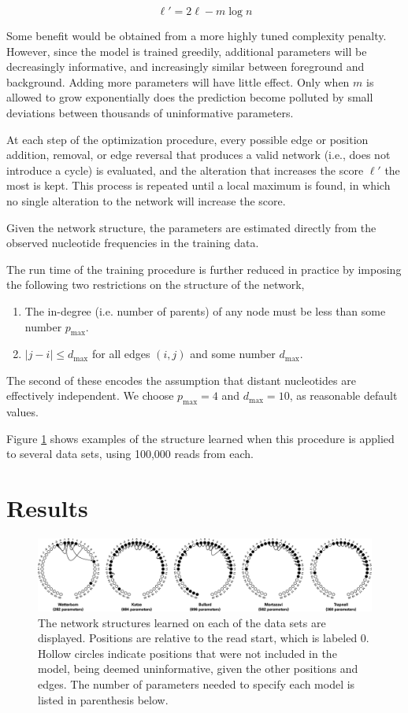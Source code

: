 \documentclass{bioinfo}
\begin{document}
$$ \ell' = 2 \ell - m \log n $$

Some benefit would be obtained from a more highly tuned complexity penalty.
However, since the model is trained greedily, additional parameters will be
decreasingly informative, and increasingly similar between foreground and
background. Adding more parameters will have little effect.  Only when $m$ is
allowed to grow exponentially does the prediction become polluted by small
deviations between thousands of uninformative parameters.

At each step of the optimization procedure, every possible edge or position
addition, removal, or edge reversal that produces a valid network (i.e., does not
introduce a cycle) is evaluated, and the alteration that increases the score
$\ell'$ the most is kept.  This process is repeated until a local maximum is
found, in which no single alteration to the network will increase the score.

Given the network structure, the parameters are estimated directly from the
observed nucleotide frequencies in the training data.

The run time of the training procedure is further reduced in practice by imposing the
following two restrictions on the structure of the network,
\begin{enumerate}
\item The in-degree (i.e. number of parents) of any node must be less than some
number $p_{\text{max}}$.
\item $|j - i| \le d_{\text{max}}$ for all edges $(i,j)$ and some number $d_{\text{max}}$.
\end{enumerate}
The second of these encodes the assumption that distant nucleotides are
effectively independent. We choose $p_{\text{max}} = 4$ and $d_{\text{max}} =
10$, as reasonable default values.

Figure \ref{fig:models} shows examples of the structure learned when this
procedure is applied to several data sets, using 100,000 reads from each.


\section{Results}

\begin{figure}
\centerline{\includegraphics[width=\textwidth]{models.eps}}
\caption{
The network structures learned on each of the data sets are displayed. Positions
are relative to the read start, which is labeled 0. Hollow circles indicate
positions that were not included in the model, being deemed uninformative, given
the other positions and edges. The number of parameters needed to
specify each model is listed in parenthesis below.}
\label{fig:models}
\end{figure}
\end{document}

